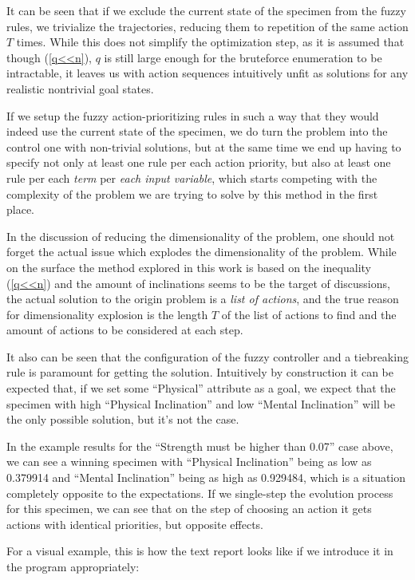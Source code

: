 \documentclass[12pt, a4paper]{report}
\begin{document}
	It can be seen that if we exclude the current state of the specimen from the fuzzy rules, we trivialize the trajectories, reducing them to repetition of the same action $T$ times.
	While this does not simplify the optimization step, as it is assumed that though (\ref{q<<n}), $q$ is still large enough for the bruteforce enumeration to be intractable, it leaves us with action sequences intuitively unfit as solutions for any realistic nontrivial goal states.
	
	If we setup the fuzzy action-prioritizing rules in such a way that they would indeed use the current state of the specimen, we do turn the problem into the control one with non-trivial solutions, but at the same time we end up having to specify not only at least one rule per each action priority, but also at least one rule per each \textit{term} per \textit{each input variable}, which starts competing with the complexity of the problem we are trying to solve by this method in the first place.
	
	In the discussion of reducing the dimensionality of the problem, one should not forget the actual issue which explodes the dimensionality of the problem.
	While on the surface the method explored in this work is based on the inequality (\ref{q<<n}) and the amount of inclinations seems to be the target of discussions, the actual solution to the origin problem is a \textit{list of actions}, and the true reason for dimensionality explosion is the length $T$ of the list of actions to find and the amount of actions to be considered at each step.
	
	It also can be seen that the configuration of the fuzzy controller and a tiebreaking rule is paramount for getting the solution.
	Intuitively by construction it can be expected that, if we set some ``Physical'' attribute as a goal, we expect that the specimen with high ``Physical Inclination'' and low ``Mental Inclination'' will be the only possible solution, but it's not the case.
	
	In the example results for the ``Strength must be higher than 0.07'' case above, we can see a winning specimen with ``Physical Inclination'' being as low as 0.379914 and ``Mental Inclination'' being as high as 0.929484,
	which is a situation completely opposite to the expectations.
	If we single-step the evolution process for this specimen, we can see that on the step of choosing an action it gets actions with identical priorities, but opposite effects.
	
	For a visual example, this is how the text report looks like if we introduce it in the program appropriately:
	
\end{document}
